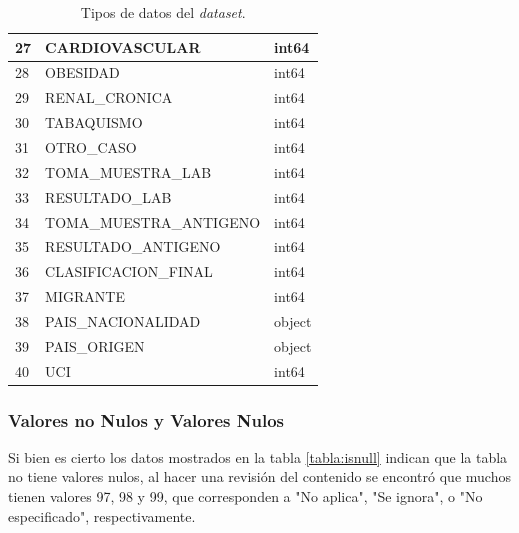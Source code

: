 \begin{table}[h]
{\begin{tabular}{|l|l|l|}
27 & CARDIOVASCULAR          & int64      \\ \hline
28 & OBESIDAD                & int64      \\ \hline
29 & RENAL\_CRONICA          & int64      \\ \hline
30 & TABAQUISMO              & int64      \\ \hline
31 & OTRO\_CASO              & int64      \\ \hline
32 & TOMA\_MUESTRA\_LAB      & int64      \\ \hline
33 & RESULTADO\_LAB          & int64      \\ \hline
34 & TOMA\_MUESTRA\_ANTIGENO & int64      \\ \hline
35 & RESULTADO\_ANTIGENO     & int64      \\ \hline
36 & CLASIFICACION\_FINAL    & int64      \\ \hline
37 & MIGRANTE                & int64      \\ \hline
38 & PAIS\_NACIONALIDAD      & object     \\ \hline
39 & PAIS\_ORIGEN            & object     \\ \hline
40 & UCI                     & int64      \\ \hline
\end{tabular}
}
\caption{Tipos de datos del \emph{dataset}.}
\label{tabla:datatype}
\end{table}

\clearpage
\subsubsection{Valores no Nulos y Valores Nulos}
Si bien es cierto los datos mostrados en la tabla \ref{tabla:isnull} indican que la tabla no tiene valores nulos, al hacer una revisión del contenido
se encontró que muchos tienen valores 97, 98 y 99, que corresponden a "No aplica", "Se ignora", o "No especificado", respectivamente.


